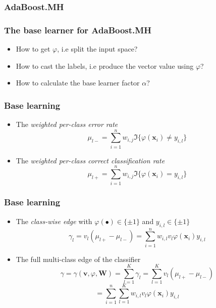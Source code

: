 \documentclass{beamer}
\begin{document}
\begin{frame}
\frametitle{AdaBoost.MH}
\begin{algorithm}[H]
\end{algorithm}
\end{frame}

\begin{frame}
\frametitle{The base learner for AdaBoost.MH}
\begin{itemize}
\item How to get $\varphi$, i.e split the input space?
\item How to cast the labels, i.e produce the vector value using  $\varphi$?
\item How to calculate the base learner factor $\alpha$?
\end{itemize}
\end{frame}

\begin{frame}
\frametitle{Base learning}
\begin{itemize}
\item The \textit{weighted per-class error rate}
$$\mu_{l-} = \sum_{i=1}^{n}w_{i,j}\mathfrak{I}\{\varphi(\mathbf{x}_i) \neq y_{i,l}\}$$
\item The \textit{weighted per-class correct classification rate}
$$\mu_{l+} = \sum_{i=1}^{n}w_{i,j}\mathfrak{I}\{\varphi(\mathbf{x}_i) = y_{i,l}\}$$
\end{itemize}
\end{frame}

\begin{frame}
\frametitle{Base learning}
\begin{itemize}
\item The \textit{class-wise edge} with $\varphi(\bullet) \in \{\pm 1\}$ and $y_{i,l} \in \{\pm 1\}$
$$\gamma_l = v_l (\mu_{l+} - \mu_{l-}) = \sum_{i=1}^{n} w_{i,l} v_l \varphi(\mathbf{x}_i) y_{i,l}$$
\item The full multi-class edge of the classifier
$$\gamma = \gamma(\mathbf{v}, \varphi, \mathbf{W}) = \sum_{l=1}^{K} \gamma_l = \sum_{l=1}^{K} v_l(\mu_{l+} - \mu_{l-})$$
$$= \sum_{i=1}^{n} \sum_{l=1}^{K} w_{i,l} v_l \varphi(\mathbf{x}_i) y_{i,l} $$
\end{itemize}
\end{frame}
\end{document}
